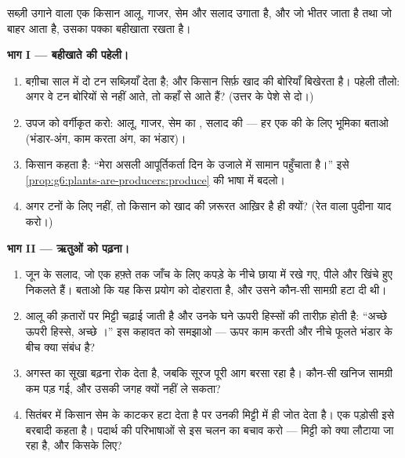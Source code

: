 \begin{problem}[{सप्ताहांत समस्या --- किसी सब्ज़ी-बग़ीचे का प्रकाश,
पत्तियाँ और बहीखाता}]\label{pb:g6:plants-are-producers:1}
सब्ज़ी उगाने वाला एक किसान आलू, गाजर, सेम और सलाद उगाता है, और जो भीतर
जाता है तथा जो बाहर आता है, उसका पक्का बहीखाता रखता है।

\medskip\noindent\textbf{भाग I --- बहीखाते की पहेली।}
\begin{enumerate}
  \item बग़ीचा साल में दो टन सब्ज़ियाँ देता है; और किसान सिर्फ़ खाद की
        बोरियाँ बिखेरता है। पहेली तौलो: अगर वे टन बोरियों से नहीं आते,
        तो कहाँ से आते हैं? (उत्तर  के पेशे से दो।)
  \item उपज को वर्गीकृत करो: आलू, गाजर, सेम का , सलाद की  ---
        हर एक की  के लिए भूमिका बताओ (भंडार-अंग, काम करता अंग,
         का भंडार)।
  \item किसान कहता है: ``मेरा असली आपूर्तिकर्ता दिन के उजाले में
        सामान पहुँचाता है।'' इसे
        \cref{prop:g6:plants-are-producers:produce} की भाषा में
        बदलो।
  \item अगर टनों के लिए नहीं, तो किसान को खाद की ज़रूरत आख़िर है ही
        क्यों? (रेत वाला पुदीना याद करो।)
\end{enumerate}

\medskip\noindent\textbf{भाग II --- ऋतुओं को पढ़ना।}
\begin{enumerate}[resume]
  \item जून के सलाद, जो एक हफ़्ते तक जाँच के लिए कपड़े के नीचे छाया में
        रखे गए, पीले और खिंचे हुए निकलते हैं। बताओ कि यह किस प्रयोग को
        दोहराता है, और उसने कौन-सी सामग्री हटा दी थी।
  \item आलू की क़तारों पर मिट्टी चढ़ाई जाती है और उनके घने ऊपरी हिस्सों
        की तारीफ़ होती है: ``अच्छे ऊपरी हिस्से, अच्छे ।'' इस कहावत
        को समझाओ --- ऊपर काम करती  और नीचे फूलते भंडार के बीच
        क्या संबंध है?
  \item अगस्त का सूखा बढ़ना रोक देता है, जबकि सूरज पूरी आग बरसा रहा है।
        कौन-सी खनिज सामग्री कम पड़ गई, और  उसकी जगह क्यों नहीं ले
        सकता?
  \item सितंबर में किसान सेम के  काटकर हटा देता है पर उनकी 
        मिट्टी में ही जोत देता है। एक पड़ोसी इसे बरबादी कहता है। पदार्थ
        की परिभाषाओं से इस चलन का बचाव करो --- मिट्टी को क्या लौटाया
        जा रहा है, और किसके लिए?
\end{enumerate}


\end{problem}
